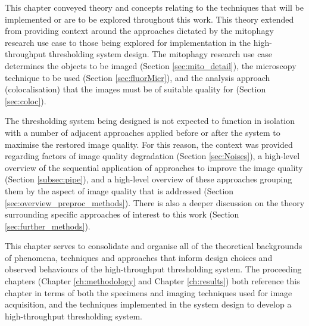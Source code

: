This chapter conveyed theory and concepts relating to the techniques that will be implemented or are to be explored throughout this work. This theory extended from providing context around the approaches dictated by the mitophagy research use case to those being explored for implementation in the high-throughput thresholding system design. The mitophagy research use case determines the objects to be imaged (Section \ref{sec:mito_detail}), the microscopy technique to be used (Section \ref{sec:fluorMicr}), and the analysis approach (colocalisation) that the images must be of suitable quality for (Section \ref{sec:coloc}).\par The thresholding system being designed is not expected to function in isolation with a number of adjacent approaches applied before or after the system to maximise the restored image quality. For this reason, the context was provided regarding factors of image quality degradation (Section \ref{sec:Noises}), a high-level overview of the sequential application of approaches to improve the image quality (Section \ref{subsec:pipe}), and a high-level overview of these approaches grouping them by the aspect of image quality that is addressed (Section \ref{sec:overview_preproc_methods}). There is also a deeper discussion on the theory surrounding specific approaches of interest to this work (Section \ref{sec:further_methods}).\par This chapter serves to consolidate and organise all of the theoretical backgrounds of phenomena, techniques and approaches that inform design choices and observed behaviours of the high-throughput thresholding system. The proceeding chapters (Chapter \ref{ch:methodology} and Chapter \ref{ch:results}) both reference this chapter in terms of both the specimens and imaging techniques used for image acquisition, and the techniques implemented in the system design to develop a high-throughput thresholding system. 
 